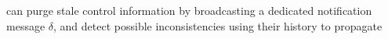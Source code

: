 
\begin{theorem}
  \Processes can purge stale control information by broadcasting a
  dedicated notification message $\delta$, and detect possible
  inconsistencies using their history to propagate 
\end{theorem}

